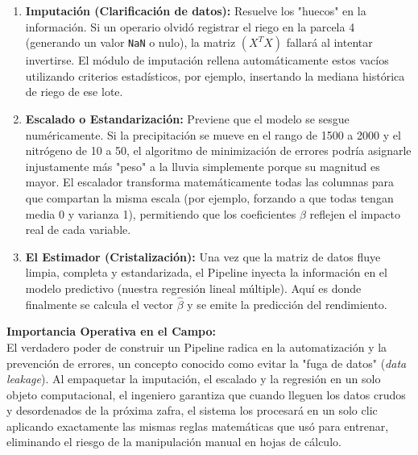 \documentclass{article}
\begin{document}
\begin{enumerate}
    \item \textbf{Imputación (Clarificación de datos):} Resuelve los "huecos" en la información. Si un operario olvidó registrar el riego en la parcela 4 (generando un valor \texttt{NaN} o nulo), la matriz $(X^T X)$ fallará al intentar invertirse. El módulo de imputación rellena automáticamente estos vacíos utilizando criterios estadísticos, por ejemplo, insertando la mediana histórica de riego de ese lote.
    
    \item \textbf{Escalado o Estandarización:} Previene que el modelo se sesgue numéricamente. Si la precipitación se mueve en el rango de 1500 a 2000 y el nitrógeno de 10 a 50, el algoritmo de minimización de errores podría asignarle injustamente más "peso" a la lluvia simplemente porque su magnitud es mayor. El escalador transforma matemáticamente todas las columnas para que compartan la misma escala (por ejemplo, forzando a que todas tengan media 0 y varianza 1), permitiendo que los coeficientes $\beta$ reflejen el impacto real de cada variable.
    
    \item \textbf{El Estimador (Cristalización):} Una vez que la matriz de datos fluye limpia, completa y estandarizada, el Pipeline inyecta la información en el modelo predictivo (nuestra regresión lineal múltiple). Aquí es donde finalmente se calcula el vector $\hat{\beta}$ y se emite la predicción del rendimiento.
\end{enumerate}

\textbf{Importancia Operativa en el Campo:} \\
El verdadero poder de construir un Pipeline radica en la automatización y la prevención de errores, un concepto conocido como evitar la "fuga de datos" (\textit{data leakage}). Al empaquetar la imputación, el escalado y la regresión en un solo objeto computacional, el ingeniero garantiza que cuando lleguen los datos crudos y desordenados de la próxima zafra, el sistema los procesará en un solo clic aplicando exactamente las mismas reglas matemáticas que usó para entrenar, eliminando el riesgo de la manipulación manual en hojas de cálculo.
\end{document}
